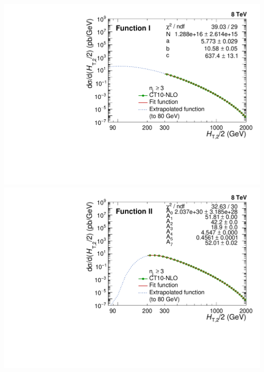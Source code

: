 \documentclass{beamer}
\begin{document}
\begin{frame}
\begin{center}
\includegraphics[scale = 0.22]{Plots_HT_2_150/Extrapolate_Theory_3_HT_2_150_funcI.pdf}%
\includegraphics[scale = 0.22]{Plots_HT_2_150/Extrapolate_Theory_3_HT_2_150_funcII.pdf}
\end{center}
\end{frame}

\end{document}
